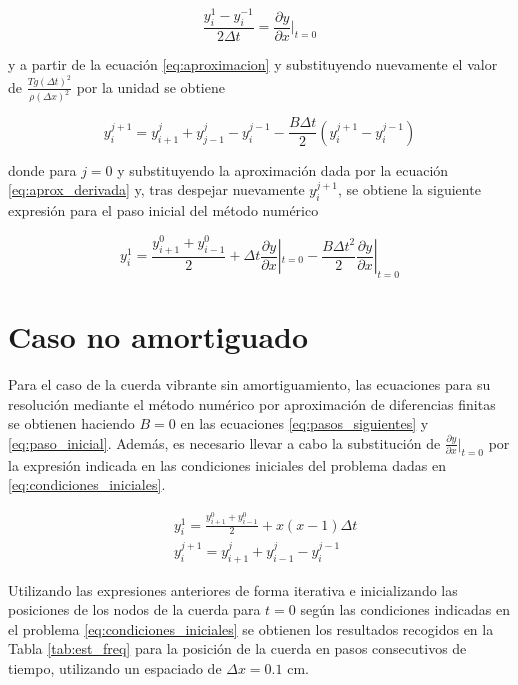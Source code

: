 \documentclass[11pt]{article}
\begin{document}
\begin{equation}
\frac{y^1_i - y^{-1}_i}{2\Delta{t}} = \frac{\partial{y}}{\partial{x}}|_{t=0}
\label{eq:aprox_derivada}
\end{equation}

y a partir de la ecuación \eqref{eq:aproximacion} y substituyendo nuevamente el valor de 
$\frac{Tg(\Delta{t})^2}{\rho(\Delta{x})^2}$ por la unidad se obtiene

\begin{equation}
y^{j+1}_i = y^{j}_{i+1} + y^{j}_{j-1} - y^{j-1}_i - \frac{B\Delta{t}}{2}(y^{j+1}_i - y^{j-1}_i)
\end{equation}

donde para $j=0$ y substituyendo la aproximación dada por la ecuación
\ref{eq:aprox_derivada} y, tras despejar nuevamente $y^{j+1}_i$, se obtiene la siguiente
expresión para el paso inicial del método numérico

\begin{equation}
y^1_i = \frac{y^0_{i+1} + y^0_{i-1}}{2} + \Delta{t}\frac{\partial{y}}{\partial{x}}|_{t=0}
	- \frac{B\Delta{t}^2}{2}\frac{\partial{y}}{\partial{x}}|_{t=0}
\label{eq:paso_inicial}
\end{equation}

\section{Caso no amortiguado}
Para el caso de la cuerda vibrante sin amortiguamiento, las ecuaciones para su resolución
mediante el método numérico por aproximación de diferencias finitas se obtienen haciendo
$B=0$ en las ecuaciones \eqref{eq:pasos_siguientes} y \eqref{eq:paso_inicial}. Además, es
necesario llevar a cabo la substitución de $\frac{\partial{y}}{\partial{x}}|_{t=0}$ por la
expresión indicada en las condiciones iniciales del problema dadas en
\eqref{eq:condiciones_iniciales}.

\begin{subequations}
\begin{flalign}
	&y^1_i = \frac{y^0_{i+1} + y^0_{i-1}}{2} + x(x-1)\Delta{t}\\
	&y^{j+1}_i = y^j_{i+1} + y^j_{i-1} - y^{j-1}_i
\end{flalign}
\end{subequations}

Utilizando las expresiones anteriores de forma iterativa e inicializando las posiciones de
los nodos de la cuerda para $t=0$ según las condiciones indicadas en el problema
\eqref{eq:condiciones_iniciales} se obtienen los resultados recogidos en la Tabla 
\ref{tab:est_freq} para la posición de la cuerda en pasos consecutivos de tiempo, 
utilizando un espaciado de $\Delta{x} = 0.1$ cm.
\end{document}
